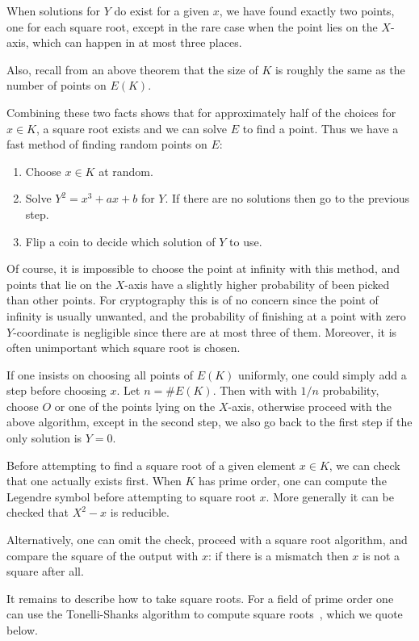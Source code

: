 When solutions for $Y$ do exist for a given $x$,
we have found exactly two points, one for each square root, except
in the rare case when the point lies on the $X$-axis, which can happen in
at most three places.

Also, recall from an above theorem that the size of $K$ is roughly the same
as the number of points on $E(K)$.

Combining these two facts shows that
for approximately half of the choices for $x \in K$,
a square root exists and we can solve $E$ to
find a point. Thus we have a fast method of finding random points on
$E$:

\begin{enumerate}
\item
Choose $x \in K$ at random.
\item
Solve $Y^2 = x^3 + a x + b$ for $Y$. If there are no solutions
then go to the previous step.
\item
Flip a coin to decide which solution of $Y$ to use.
\end{enumerate}

Of course, it is impossible to choose the point at infinity with this method,
and points that lie on the $X$-axis have a slightly higher probability of
been picked than other points. For cryptography this is of no concern
since the point of infinity is usually unwanted, and the probability
of finishing at a point with zero $Y$-coordinate is negligible since there
are at most three of them. Moreover, it is often unimportant which
square root is chosen.

If one insists on choosing all points of $E(K)$ uniformly, one could simply
add a step before choosing $x$.
Let $n = \#E(K)$. Then with
with $1/n$ probability,
choose $O$ or one of the points lying
on the $X$-axis, otherwise proceed with the above algorithm, except
in the second step, we also go back to the first step if the only solution
is $Y = 0$.

Before attempting to find a square root of a given element $x \in K$,
we can check that one actually exists first.
When $K$ has prime order,
one can compute the Legendre symbol before attempting to square root $x$.
More generally it can be checked that $X^2 - x$ is reducible.

Alternatively,
one can omit the check, proceed with a square root algorithm,
and compare the square of the output with $x$: if there is a mismatch
then $x$ is not a square after all.

It remains to describe how to take square roots.
For a field of prime order one can use the Tonelli-Shanks algorithm
to compute square roots~\cite{bss, handbook}, which we quote below.

